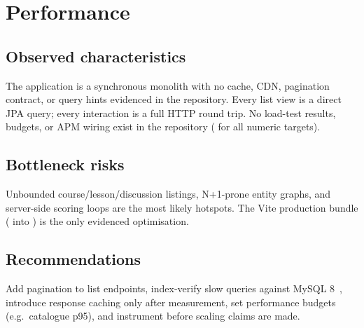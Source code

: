 \section{Performance}
\label{sec:performance}

\subsection{Observed characteristics}

The application is a synchronous monolith with no cache, CDN, pagination contract, or query hints evidenced in the repository. Every list view is a direct JPA query; every interaction is a full HTTP round trip. No load-test results, budgets, or APM wiring exist in the repository ( for all numeric targets).

\subsection{Bottleneck risks}

Unbounded course/lesson/discussion listings, N+1-prone entity graphs, and server-side scoring loops are the most likely hotspots. The Vite production bundle ( into ) is the only evidenced optimisation.

\subsection{Recommendations}

Add pagination to list endpoints, index-verify slow queries against MySQL 8~\cite{mysql}, introduce response caching only after measurement, set performance budgets (e.g.\ catalogue p95), and instrument before scaling claims are made.
